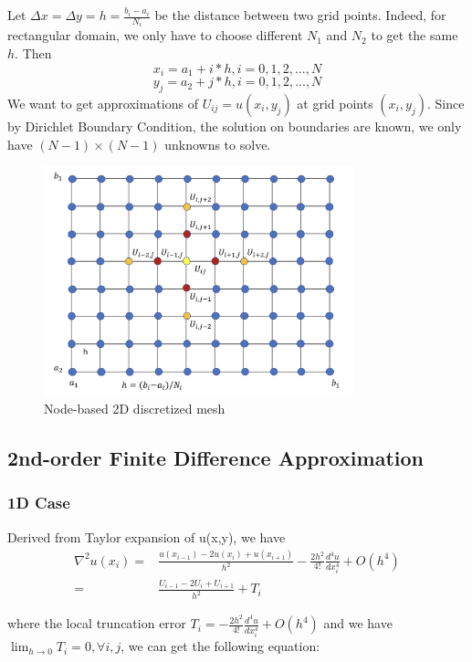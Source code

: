 \documentclass[a4paper]{article}
\begin{document}
Let $\Delta x = \Delta y = h = \frac{b_i-a_i}{N_i}$ be the distance between two grid points. Indeed, for rectangular domain, we only have to choose different $N_1$ and $N_2$ to get the same $h$. Then
$$x_i = a_1 + i*h, i = 0,1,2,...,N$$
$$y_j = a_2 + j*h, i = 0,1,2,...,N$$
We want to get approximations of $U_{ij} = u(x_i,y_j)$ at grid points $(x_i, y_j)$. Since by Dirichlet Boundary Condition, the solution on boundaries are known, we only have $(N-1)\times (N-1)$ unknowns to solve.

\begin{figure}[htbp]
\centering
\includegraphics[width=0.8\textwidth]{2d.png}
\caption{\label{2d}Node-based 2D discretized mesh}
\end{figure}

\subsection{2nd-order Finite Difference Approximation}
\subsubsection{1D Case}
Derived from Taylor expansion of u(x,y), we have
\begin{equation}
    \begin{split}
    \nabla^2u(x_i) = & \frac{u(x_{i-1}) - 2u(x_i) + u(x_{i+1})}{h^2} -\frac{2h^2}{4!}\frac{d^4 u}{d x_i^4} + O(h^4)\\ 
    = & \frac{U_{i-1} - 2U_{i} + U_{i+1} }{h^2} + T_{i}
    \end{split}
\end{equation}

where the local truncation error $T_{i} = -\frac{2h^2}{4!}\frac{d^4 u}{d x_i^4} + O(h^4)$ and we have $\lim_{h\rightarrow 0} T_{i} = 0, \forall i,j$, we can get the following equation:
\end{document}
